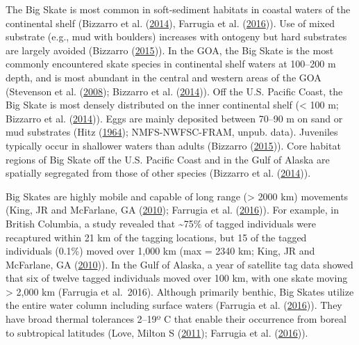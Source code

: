 \documentclass[12pt,]{article}
\begin{document}
The Big Skate is most common in soft-sediment habitats in coastal waters
of the continental shelf (Bizzarro et al.
(\protect\hyperlink{ref-Bizzarro2014}{2014}), Farrugia et al.
(\protect\hyperlink{ref-Farrugia2016}{2016})). Use of mixed substrate
(e.g., mud with boulders) increases with ontogeny but hard substrates
are largely avoided (Bizzarro
(\protect\hyperlink{ref-Bizzarro2015}{2015})). In the GOA, the Big Skate
is the most commonly encountered skate species in continental shelf
waters at 100--200 m depth, and is most abundant in the central and
western areas of the GOA (Stevenson et al.
(\protect\hyperlink{ref-Stevenson2008}{2008}); Bizzarro et al.
(\protect\hyperlink{ref-Bizzarro2014}{2014})). Off the U.S. Pacific
Coast, the Big Skate is most densely distributed on the inner
continental shelf (\textless{} 100 m; Bizzarro et al.
(\protect\hyperlink{ref-Bizzarro2014}{2014})). Eggs are mainly deposited
between 70--90 m on sand or mud substrates (Hitz
(\protect\hyperlink{ref-Hitz1964}{1964}); NMFS-NWFSC-FRAM, unpub. data).
Juveniles typically occur in shallower waters than adults (Bizzarro
(\protect\hyperlink{ref-Bizzarro2015}{2015})). Core habitat regions of
Big Skate off the U.S. Pacific Coast and in the Gulf of Alaska are
spatially segregated from those of other species (Bizzarro et al.
(\protect\hyperlink{ref-Bizzarro2014}{2014})).

Big Skates are highly mobile and capable of long range (\textgreater{}
2000 km) movements (King, JR and McFarlane, GA
(\protect\hyperlink{ref-KingandMcF2010}{2010}); Farrugia et al.
(\protect\hyperlink{ref-Farrugia2016}{2016})). For example, in British
Columbia, a study revealed that \textasciitilde{}75\% of tagged
individuals were recaptured within 21 km of the tagging locations, but
15 of the tagged individuals (0.1\%) moved over 1,000 km (max = 2340 km;
King, JR and McFarlane, GA
(\protect\hyperlink{ref-KingandMcF2010}{2010})). In the Gulf of Alaska,
a year of satellite tag data showed that six of twelve tagged
individuals moved over 100 km, with one skate moving \textgreater{}
2,000 km (Farrugia et al.~2016). Although primarily benthic, Big Skates
utilize the entire water column including surface waters (Farrugia et
al. (\protect\hyperlink{ref-Farrugia2016}{2016})). They have broad
thermal tolerances 2--19º C that enable their occurrence from boreal to
subtropical latitudes (Love, Milton S
(\protect\hyperlink{ref-Love2011}{2011}); Farrugia et al.
(\protect\hyperlink{ref-Farrugia2016}{2016})).
\end{document}
